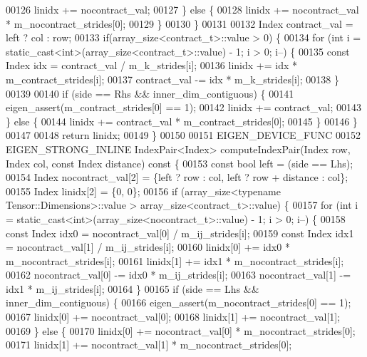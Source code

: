 \begin{DoxyCode}
00126         linidx += nocontract\_val;
00127       \} \textcolor{keywordflow}{else} \{
00128         linidx += nocontract\_val * m\_nocontract\_strides[0];
00129       \}
00130     \}
00131 
00132     Index contract\_val = left ? col : row;
00133     \textcolor{keywordflow}{if}(array\_size<contract\_t>::value > 0) \{
00134       \textcolor{keywordflow}{for} (\textcolor{keywordtype}{int} i = static\_cast<int>(array\_size<contract\_t>::value) - 1; i > 0; i--) \{
00135         \textcolor{keyword}{const} Index idx = contract\_val / m\_k\_strides[i];
00136         linidx += idx * m\_contract\_strides[i];
00137         contract\_val -= idx * m\_k\_strides[i];
00138       \}
00139 
00140       \textcolor{keywordflow}{if} (side == Rhs && inner\_dim\_contiguous) \{
00141         eigen\_assert(m\_contract\_strides[0] == 1);
00142         linidx += contract\_val;
00143       \} \textcolor{keywordflow}{else} \{
00144         linidx += contract\_val * m\_contract\_strides[0];
00145       \}
00146     \}
00147 
00148     \textcolor{keywordflow}{return} linidx;
00149   \}
00150 
00151   EIGEN\_DEVICE\_FUNC
00152   EIGEN\_STRONG\_INLINE IndexPair<Index> computeIndexPair(Index row, Index col, \textcolor{keyword}{const} Index distance)\textcolor{keyword}{ const }\{
00153     \textcolor{keyword}{const} \textcolor{keywordtype}{bool} left = (side == Lhs);
00154     Index nocontract\_val[2] = \{left ? row : col, left ? row + distance : col\};
00155     Index linidx[2] = \{0, 0\};
00156     \textcolor{keywordflow}{if} (array\_size<typename Tensor::Dimensions>::value > array\_size<contract\_t>::value) \{
00157       \textcolor{keywordflow}{for} (\textcolor{keywordtype}{int} i = static\_cast<int>(array\_size<nocontract\_t>::value) - 1; i > 0; i--) \{
00158         \textcolor{keyword}{const} Index idx0 = nocontract\_val[0] / m\_ij\_strides[i];
00159         \textcolor{keyword}{const} Index idx1 = nocontract\_val[1] / m\_ij\_strides[i];
00160         linidx[0] += idx0 * m\_nocontract\_strides[i];
00161         linidx[1] += idx1 * m\_nocontract\_strides[i];
00162         nocontract\_val[0] -= idx0 * m\_ij\_strides[i];
00163         nocontract\_val[1] -= idx1 * m\_ij\_strides[i];
00164       \}
00165       \textcolor{keywordflow}{if} (side == Lhs && inner\_dim\_contiguous) \{
00166         eigen\_assert(m\_nocontract\_strides[0] == 1);
00167         linidx[0] += nocontract\_val[0];
00168         linidx[1] += nocontract\_val[1];
00169       \} \textcolor{keywordflow}{else} \{
00170         linidx[0] += nocontract\_val[0] * m\_nocontract\_strides[0];
00171         linidx[1] += nocontract\_val[1] * m\_nocontract\_strides[0];

\end{DoxyCode}
